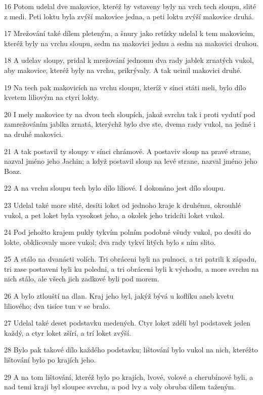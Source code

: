 \par 16 Potom udelal dve makovice, kteréž by vstaveny byly na vrch tech sloupu, slité z medi. Peti loktu byla zvýší makovice jedna, a peti loktu zvýší makovice druhá.
\par 17 Mrežování také dílem pleteným, a šnury jako retízky udelal k tem makovicím, kteréž byly na vrchu sloupu, sedm na makovici jednu a sedm na makovici druhou.
\par 18 A udelav sloupy, pridal k mrežování jednomu dva rady jablek zrnatých vukol, aby makovice, kteréž byly na vrchu, prikrývaly. A tak ucinil makovici druhé.
\par 19 Na tech pak makovicích na vrchu sloupu, kteríž v sínci státi meli, bylo dílo kvetem liliovým na ctyri lokty.
\par 20 I mely makovice ty na dvou tech sloupích, jakož svrchu tak i proti vydutí pod zamrežováním jablka zrnatá, kterýchž bylo dve ste, dvema rady vukol, na jedné i na druhé makovici.
\par 21 A tak postavil ty sloupy v sínci chrámové. A postaviv sloup na pravé strane, nazval jméno jeho Jachin; a když postavil sloup na levé strane, nazval jméno jeho Boaz.
\par 22 A na vrchu sloupu tech bylo dílo liliové. I dokonáno jest dílo sloupu.
\par 23 Udelal také more slité, desíti loket od jednoho kraje k druhému, okrouhlé vukol, a pet loket byla vysokost jeho, a okolek jeho tridcíti loket vukol.
\par 24 Pod jehožto krajem pukly tykvím polním podobné všudy vukol, po desíti do lokte, obklicovaly more vukol; dva rady tykví litých bylo s ním slito.
\par 25 A stálo na dvanácti volích. Tri obráceni byli na pulnoci, a tri patrili k západu, tri zase postaveni byli ku poledni, a tri obráceni byli k východu, a more svrchu na nich stálo, ale všech jich zadkové byli pod morem.
\par 26 A bylo ztlouští na dlan. Kraj jeho byl, jakýž bývá u koflíku aneb kvetu liliového; dva tisíce tun v se bralo.
\par 27 Udelal také deset podstavku medených. Ctyr loket zdélí byl podstavek jeden každý, a ctyr loket zšírí, a trí loket zvýší.
\par 28 Bylo pak takové dílo každého podstavku; lištování bylo vukol na nich, kteréžto lištování bylo po krajích jeho.
\par 29 A na tom lištování, kteréž bylo po krajích, lvové, volové a cherubínové byli, a nad temi kraji byl sloupec svrchu, a pod lvy a voly obruba dílem taženým.

